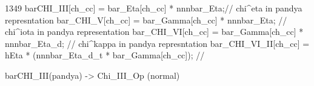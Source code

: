 1349
barCHI_III[ch_cc] = bar_Eta[ch_cc] * nnnbar_Eta;// chi^eta in pandya represntation
bar_CHI_V[ch_cc] = bar_Gamma[ch_cc] * nnnbar_Eta; // chi^iota in pandya representation
bar_CHI_VI[ch_cc] = bar_Gamma[ch_cc] * nnnbar_Eta_d; // chi^kappa in pandya represntation
 bar_CHI_VI_II[ch_cc] = hEta * (nnnbar_Eta_d_t * bar_Gamma[ch_cc]); // 

 barCHI_III(pandya) -> Chi_III_Op (normal)

